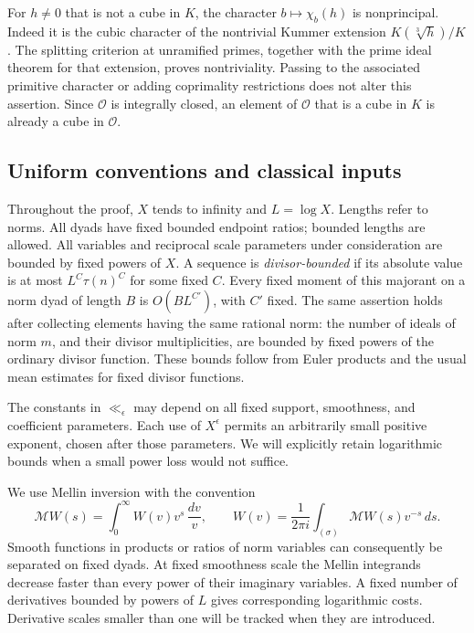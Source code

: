 For $h\ne0$ that is not a cube in $K$, the character
$b\mapsto\chi_b(h)$ is nonprincipal. Indeed it is the cubic character
of the nontrivial Kummer extension $K(\sqrt[3]{h})/K$.
The splitting criterion at unramified primes, together with the prime
ideal theorem for that extension, proves nontriviality.
Passing to the associated primitive character or adding coprimality
restrictions does not alter this assertion. Since $\mathcal O$ is
integrally closed, an element of $\mathcal O$ that is a cube in $K$
is already a cube in $\mathcal O$.

\subsection{Uniform conventions and classical inputs}

Throughout the proof, $X$ tends to infinity and $L=\log X$.
Lengths refer to norms. All dyads have fixed bounded endpoint ratios;
bounded lengths are allowed. All variables and reciprocal scale
parameters under consideration are bounded by fixed powers of $X$.
A sequence is \emph{divisor-bounded} if its absolute value is at most
$L^C\tau(n)^C$ for some fixed $C$.
Every fixed moment of this majorant on a norm dyad of length $B$ is
$O(BL^{C'})$, with $C'$ fixed. The same assertion holds after collecting
elements having the same rational norm: the number of ideals of norm
$m$, and their divisor multiplicities, are bounded by fixed powers of
the ordinary divisor function. These bounds follow from Euler products
and the usual mean estimates for fixed divisor functions.

The constants in $\ll_\epsilon$ may depend on all fixed support,
smoothness, and coefficient parameters. Each use of $X^\epsilon$ permits
an arbitrarily small positive exponent, chosen after those parameters.
We will explicitly retain logarithmic bounds when a small power loss
would not suffice.

We use Mellin inversion with the convention
\[
 \mathcal MW(s)=\int_0^\infty W(v)v^s\,\frac{dv}{v},\qquad
 W(v)=\frac{1}{2\pi i}\int_{(\sigma)}\mathcal MW(s)v^{-s}\,ds.
\]
Smooth functions in products or ratios of norm variables can consequently
be separated on fixed dyads. At fixed smoothness scale the Mellin
integrands decrease faster than every power of their imaginary
variables. A fixed number of derivatives bounded by powers of $L$
gives corresponding logarithmic costs. Derivative scales smaller than
one will be tracked when they are introduced.

